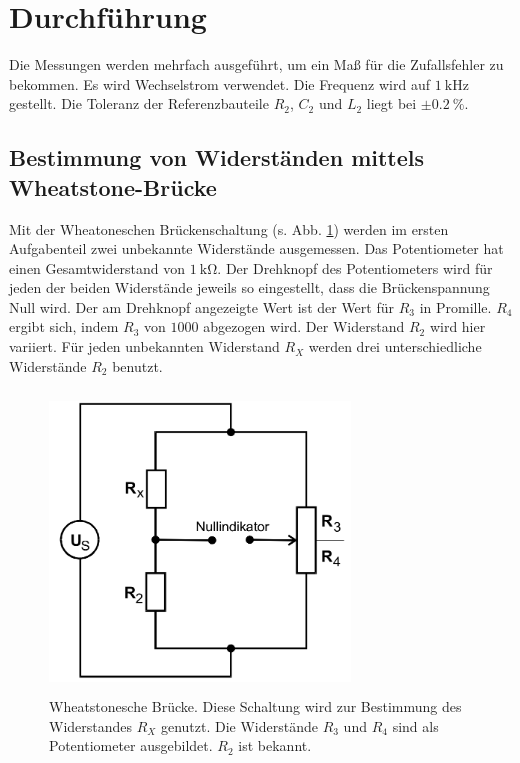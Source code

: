 \section{Durchführung}
\label{sec:Durchführung}

Die Messungen werden mehrfach ausgeführt, um ein Maß für die Zufallsfehler zu bekommen.
Es wird Wechselstrom verwendet. Die Frequenz wird auf $\SI{1}{\kilo\hertz}$ gestellt.
Die Toleranz der Referenzbauteile $R_2$, $C_2$ und $L_2$ liegt bei $\pm \SI{0.2}{\percent}$.

\subsection{Bestimmung von Widerständen mittels Wheatstone-Brücke}
Mit der Wheatoneschen Brückenschaltung (s. Abb. \ref{wheatstone}) werden im ersten Aufgabenteil zwei unbekannte Widerstände ausgemessen.
Das Potentiometer hat einen Gesamtwiderstand von $\SI{1}{\kilo\ohm}$.
Der Drehknopf des Potentiometers wird für jeden der beiden Widerstände 
jeweils so eingestellt, dass die Brückenspannung Null wird. 
Der am Drehknopf angezeigte Wert ist der Wert für $R_3$ in Promille. 
$R_4$ ergibt sich, indem $R_3$ von $\num{1000}$ abgezogen wird.
Der Widerstand $R_2$ wird hier variiert. Für jeden unbekannten Widerstand $R_X$
werden drei unterschiedliche Widerstände $R_2$ benutzt.
\begin{figure}
    \centering
    \includegraphics[width=8cm, height=8cm]{build/wheatstone.png}
    \caption{Wheatstonesche Brücke. Diese Schaltung wird zur Bestimmung
    des Widerstandes $R_X$ genutzt. Die Widerstände $R_3$ und $R_4$
    sind als Potentiometer ausgebildet. $R_2$ ist bekannt.}
    \label{wheatstone}
\end{figure}

